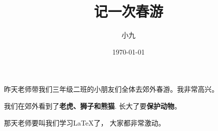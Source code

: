 \documentclass[a4paper]{article}
\author{小九}
\title{记一次春游}
\date{\today}
\begin{document}
\pagestyle{plain}
\maketitle

昨天老师带我们三年级二班的小朋友们全体去郊外春游。我非常高兴。

我们在郊外看到了\textbf{老虎、狮子和熊猫}.
长大了要\textbf{保护动物}。

那天老师要叫我们学习\LaTeX{}了， 大家都非常激动。
\end{document}
